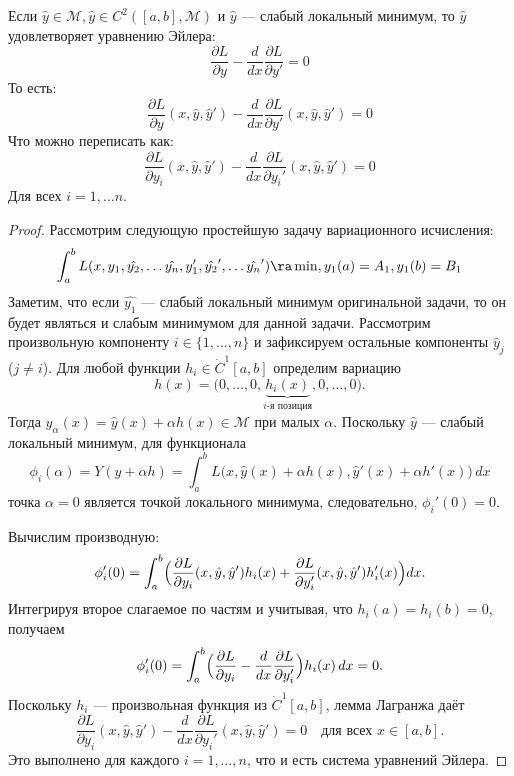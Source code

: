 \begin{theorem}
    Если \(\hat{y} \in \mathcal{M}, \hat{y} \in C^2([a, b], \mathcal{M})\) и \(\hat{y}\) --- слабый локальный минимум, то \(\hat{y}\) удовлетворяет уравнению Эйлера:
    \[\frac{\partial L}{\partial y} - \frac{d}{dx}\frac{\partial L}{\partial y'} = 0\]
    То есть:
    \[\frac{\partial L}{\partial y}(x, \hat{y}, \hat{y}') - \frac{d}{dx}\frac{\partial L}{\partial y'}(x, \hat{y}, \hat{y}') = 0\]
    Что можно переписать как:
    \[\frac{\partial L}{\partial y_i}(x, \hat{y}, \hat{y}') - \frac{d}{dx}\frac{\partial L}{\partial y_i'}(x, \hat{y}, \hat{y}') = 0\]
    Для всех \(i = 1, \dots n\).
\end{theorem}
\begin{proof}
    Рассмотрим следующую простейшую задачу вариационного исчисления:
    \[\int_a^bL(x, y_1, \hat{y_2}, \dots \hat{y_n}, y_1', \hat{y_2}', \dots \hat{y_n}') \ra \min, y_1(a) = A_1, y_1(b) = B_1\]
    Заметим, что если \(\hat{y_1}\) --- слабый локальный минимум оригинальной задачи, то он будет являться и слабым минимумом для данной задачи. Рассмотрим произвольную компоненту \(i\in\{1,\dots,n\}\) и зафиксируем остальные компоненты \(\hat{y}_j\) (\(j\ne i\)). Для любой функции \(h_i\in \dot{C}^1[a,b]\) определим вариацию
    \[
    h(x) = \bigl(0,\dots,0,\underbrace{h_i(x)}_{i\text{-я позиция}},0,\dots,0\bigr).
    \]
    Тогда \(y_\alpha(x)=\hat{y}(x)+\alpha h(x)\in\mathcal{M}\) при малых \(\alpha\). Поскольку \(\hat{y}\) — слабый локальный минимум, для функционала
    \[
    \phi_i(\alpha)=Y(\hat{y}+\alpha h)=\int_a^b L\bigl(x,\hat{y}(x)+\alpha h(x),\hat{y}'(x)+\alpha h'(x)\bigr)\,dx
    \]
    точка \(\alpha=0\) является точкой локального минимума, следовательно, \(\phi_i'(0)=0\).

    Вычислим производную:
    \[
    \phi_i'(0)=\int_a^b\Bigl( \frac{\partial L}{\partial y_i}(x,\hat{y},\hat{y}')h_i(x) + \frac{\partial L}{\partial y_i'}(x,\hat{y},\hat{y}')h_i'(x) \Bigr)dx.
    \]
    Интегрируя второе слагаемое по частям и учитывая, что \(h_i(a)=h_i(b)=0\), получаем
    \[
    \phi_i'(0)=\int_a^b\Bigl( \frac{\partial L}{\partial y_i} - \frac{d}{dx}\frac{\partial L}{\partial y_i'} \Bigr)h_i(x)\,dx = 0.
    \]
    Поскольку \(h_i\) — произвольная функция из \(\dot{C}^1[a,b]\), лемма Лагранжа даёт
    \[
    \frac{\partial L}{\partial y_i}(x,\hat{y},\hat{y}') - \frac{d}{dx}\frac{\partial L}{\partial y_i'}(x,\hat{y},\hat{y}') = 0 \quad \text{для всех } x\in[a,b].
    \]
    Это выполнено для каждого \(i=1,\dots,n\), что и есть система уравнений Эйлера.
\end{proof}

